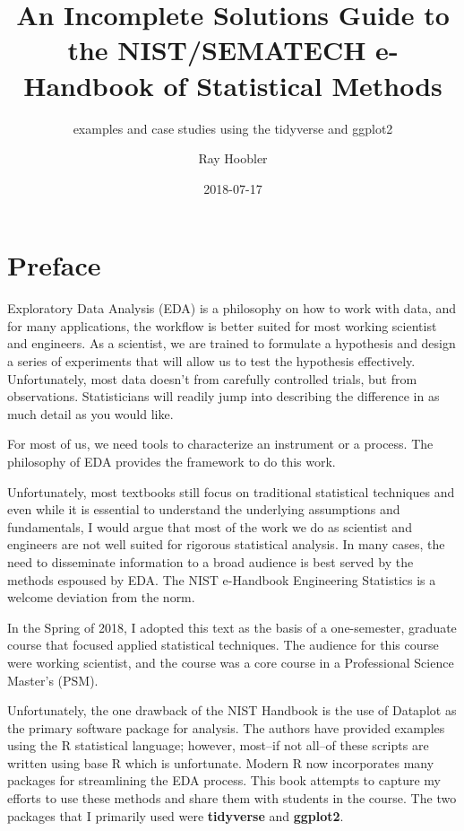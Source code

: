 \documentclass[]{book}
\title{An Incomplete Solutions Guide to the NIST/SEMATECH e-Handbook of
Statistical Methods}
\subtitle{examples and case studies using the tidyverse and ggplot2}
\author{Ray Hoobler}
\date{2018-07-17}
\theoremstyle{definition}
\theoremstyle{definition}
\theoremstyle{definition}
\theoremstyle{remark}
\begin{document}
\maketitle

{
\setcounter{tocdepth}{1}
\tableofcontents
}
\hypertarget{preface}{%
\chapter*{Preface}\label{preface}}

Exploratory Data Analysis (EDA) is a philosophy on how to work with
data, and for many applications, the workflow is better suited for most
working scientist and engineers. As a scientist, we are trained to
formulate a hypothesis and design a series of experiments that will
allow us to test the hypothesis effectively. Unfortunately, most data
doesn't from carefully controlled trials, but from observations.
Statisticians will readily jump into describing the difference in as
much detail as you would like.

For most of us, we need tools to characterize an instrument or a
process. The philosophy of EDA provides the framework to do this work.

Unfortunately, most textbooks still focus on traditional statistical
techniques and even while it is essential to understand the underlying
assumptions and fundamentals, I would argue that most of the work we do
as scientist and engineers are not well suited for rigorous statistical
analysis. In many cases, the need to disseminate information to a broad
audience is best served by the methods espoused by EDA. The NIST
e-Handbook Engineering Statistics is a welcome deviation from the norm.

In the Spring of 2018, I adopted this text as the basis of a
one-semester, graduate course that focused applied statistical
techniques. The audience for this course were working scientist, and the
course was a core course in a Professional Science Master's (PSM).

Unfortunately, the one drawback of the NIST Handbook is the use of
Dataplot as the primary software package for analysis. The authors have
provided examples using the R statistical language; however, most--if
not all--of these scripts are written using base R which is unfortunate.
Modern R now incorporates many packages for streamlining the EDA
process. This book attempts to capture my efforts to use these methods
and share them with students in the course. The two packages that I
primarily used were \textbf{tidyverse} and \textbf{ggplot2}.
\end{document}
